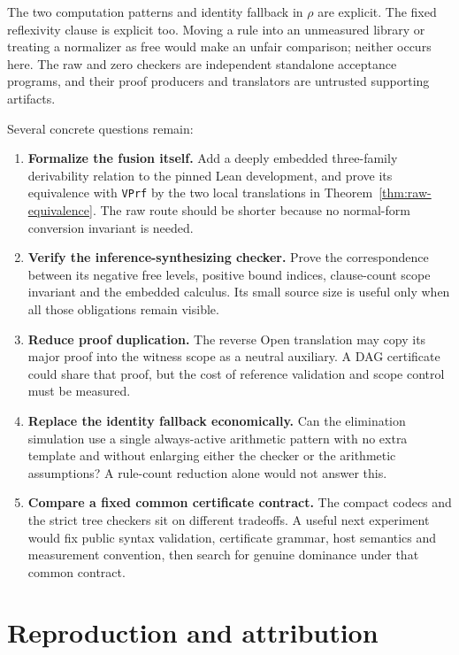 The two computation patterns and identity fallback in $\rho$ are explicit.
The fixed reflexivity clause is explicit too. Moving a rule into an
unmeasured library or treating a normalizer as free would make an unfair
comparison; neither occurs here. The raw and zero checkers are independent
standalone acceptance programs, and their proof producers and translators
are untrusted supporting artifacts.

Several concrete questions remain:
\begin{enumerate}
\item \textbf{Formalize the fusion itself.} Add a deeply embedded
      three-family derivability relation to the pinned Lean development,
      and prove its equivalence with \texttt{VPrf} by the two local
      translations in Theorem~\ref{thm:raw-equivalence}. The raw route
      should be shorter because no normal-form conversion invariant is
      needed.
\item \textbf{Verify the inference-synthesizing checker.} Prove the
      correspondence between its negative free levels, positive bound
      indices, clause-count scope invariant and the embedded calculus.
      Its small source size is useful only when all those obligations
      remain visible.
\item \textbf{Reduce proof duplication.} The reverse Open translation
      may copy its major proof into the witness scope as a neutral
      auxiliary. A DAG certificate could share that proof, but the cost
      of reference validation and scope control must be measured.
\item \textbf{Replace the identity fallback economically.} Can the
      elimination simulation use a single always-active arithmetic pattern
      with no extra template and without enlarging either the checker or
      the arithmetic assumptions? A rule-count reduction alone would not
      answer this.
\item \textbf{Compare a fixed common certificate contract.} The compact
      codecs and the strict tree checkers sit on different tradeoffs.
      A useful next experiment would fix public syntax validation,
      certificate grammar, host semantics and measurement convention,
      then search for genuine dominance under that common contract.
\end{enumerate}

\section{Reproduction and attribution}

